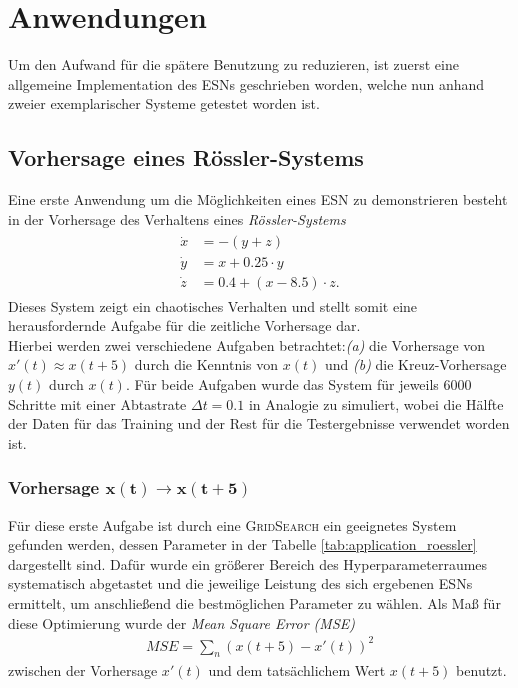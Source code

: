\section{Anwendungen}
\label{chp:applications}
Um den Aufwand für die spätere Benutzung zu reduzieren, ist zuerst eine allgemeine Implementation des \textsc{ESN}s geschrieben worden, welche nun anhand zweier exemplarischer Systeme getestet worden ist.

\subsection{Vorhersage eines Rössler-Systems}
Eine erste Anwendung um die Möglichkeiten eines \textsc{ESN} zu demonstrieren besteht in der Vorhersage des Verhaltens eines \textit{Rössler-Systems}
\begin{align}
\label{eq:application_roessler_pde}
\begin{split}
\dot{x} &= -(y+z)\\
\dot{y} &= x + 0.25 \cdot  y\\
\dot{z} &= 0.4 + (x - 8.5)\cdot z.
\end{split}
\end{align}
Dieses System zeigt ein chaotisches Verhalten und stellt somit eine herausfordernde Aufgabe für die zeitliche Vorhersage dar.\\
Hierbei werden zwei verschiedene Aufgaben betrachtet:\textit{(a)} die Vorhersage von $x'(t) \approx x(t+5)$ durch die Kenntnis von $x(t)$ und \textit{(b)} die Kreuz-Vorhersage $y(t)$ durch $x(t)$. Für beide Aufgaben wurde das System für jeweils $6000$ Schritte mit einer Abtastrate $\Delta t = 0.1$ in Analogie zu \cite{parlitz2005} simuliert, wobei die Hälfte der Daten für das Training und der Rest für die Testergebnisse verwendet worden ist.

\subsubsection[Vorhersage $x(t) \rightarrow x(t+5)$]{Vorhersage $\pmb{x(t) \rightarrow x(t+5)}$}
Für diese erste Aufgabe ist durch eine \textsc{GridSearch} ein geeignetes System gefunden werden, dessen Parameter in der Tabelle \ref{tab:application_roessler} dargestellt sind. Dafür wurde ein größerer Bereich des Hyperparameterraumes systematisch abgetastet und die jeweilige Leistung des sich ergebenen \textsc{ESN}s ermittelt, um anschließend die bestmöglichen Parameter zu wählen. Als Maß für diese Optimierung wurde der \textit{Mean Square Error (MSE)}
\begin{align}
MSE = \sum_n \left(x(t+5) - x'(t) \right)^2
\end{align}
zwischen der Vorhersage $x'(t)$ und dem tatsächlichem Wert $x(t+5)$ benutzt.

